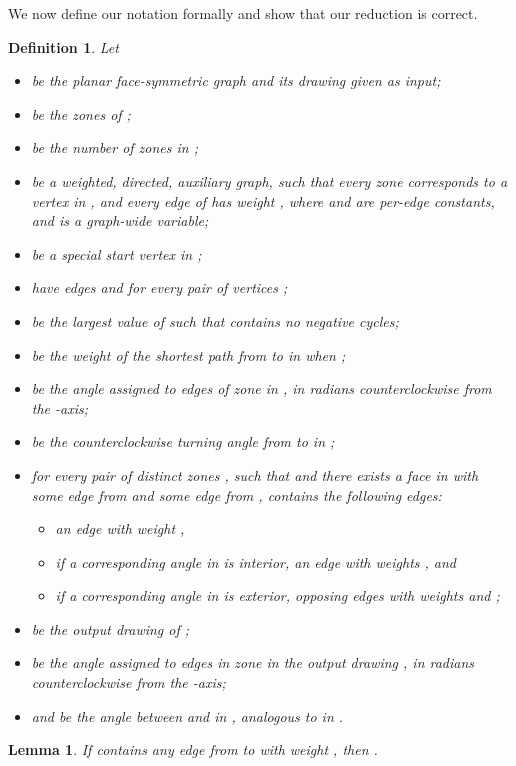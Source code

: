 \documentclass[11pt,letter]{article}
\newtheorem{lemma}[theorem]{Lemma}
\newtheorem{definition}[theorem]{Definition}
\begin{document}
We now define our notation formally and show that our reduction is correct.

\begin{definition}
Let
\begin{itemize}
\item  be the planar face-symmetric graph and its drawing given as input;
\item  be the zones of ;
\item  be the number of zones in ;
\item  be a weighted, directed, auxiliary graph, such that every zone  corresponds to a vertex  in , and every edge of  has weight , where  and  are per-edge constants, and  is a graph-wide variable;
\item  be a special start vertex in ;
\item  have edges  and  for every pair of vertices ;
\item  be the largest value of  such that  contains no negative cycles;
\item  be the weight of the shortest path from  to  in  when ;
\item  be the angle assigned to edges of zone  in , in radians counterclockwise from the -axis;
\item  be the counterclockwise turning angle from  to  in ;
\item for every pair of distinct zones , such that  and there exists a face in  with some edge from  and some edge from ,  contains the following edges:
   \begin{itemize}
   \item an edge  with weight ,
   \item if a corresponding angle in  is interior, an edge  with weights , and
   \item if a corresponding angle in  is exterior, opposing edges with weights  and ;
   \end{itemize}
\item  be the output drawing of ;
\item  be the angle assigned to edges in zone  in the output drawing , in radians counterclockwise from the -axis;
\item and  be the angle between  and  in , analogous to  in .
\end{itemize}
\end{definition}

\begin{lemma}
\label{lemma:path_lengths}
If  contains any edge from  to  with weight , then .
\end{lemma}
\end{document}
